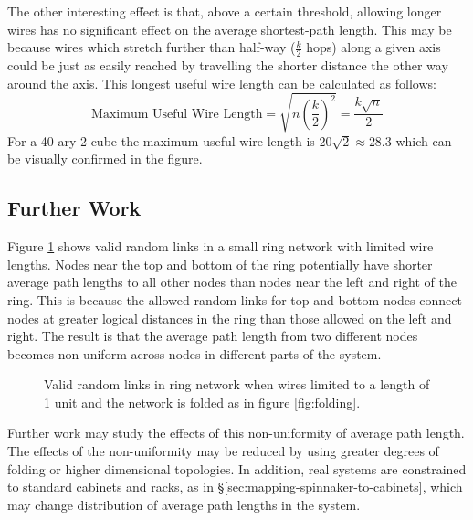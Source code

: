 			The other interesting effect is that, above a certain threshold, allowing
			longer wires has no significant effect on the average shortest-path
			length. This may be because wires which stretch further than half-way
			($\frac{k}{2}$ hops) along a given axis could be just as easily reached by
			travelling the shorter distance the other way around the axis. This
			longest useful wire length can be calculated as follows:
			\[
				\textrm{Maximum Useful Wire Length}
					= \sqrt{n \left({\frac{k}{2}}\right)^2}
					= \frac{k\sqrt{n}}{2}
			\]
			For a 40-ary 2-cube the maximum useful wire length is $20\sqrt{2} \approx
			28.3$ which can be visually confirmed in the figure.
		
		\subsection{Further Work}
			
			
			
			Figure \ref{fig:ringNetworkLimitedWires} shows valid random links in a
			small ring network with limited wire lengths. Nodes near the top and
			bottom of the ring potentially have shorter average path lengths to all
			other nodes than nodes near the left and right of the ring. This is
			because the allowed random links for top and bottom nodes connect nodes at
			greater logical distances in the ring than those allowed on the left and
			right. The result is that the average path length from two different nodes
			becomes non-uniform across nodes in different parts of the system.
			
			\begin{figure}
				\center
				
				\caption[Valid random links in a folded ring network with short
				wires.]{Valid random links in ring network when wires limited to a
				length of 1 unit and the network is folded as in figure
				\ref{fig:folding}.}
				\label{fig:ringNetworkLimitedWires}
			\end{figure}
			
			Further work may study the effects of this non-uniformity of average path
			length. The effects of the non-uniformity may be reduced by using greater
			degrees of folding or higher dimensional topologies. In addition, real
			systems are constrained to standard cabinets and racks, as in
			\S\ref{sec:mapping-spinnaker-to-cabinets}, which may change distribution
			of average path lengths in the system.
			
